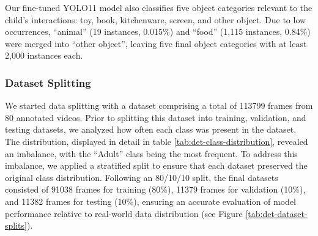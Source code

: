 \documentclass[
  man,floatsintext]{apa6}
\begin{document}
Our fine-tuned YOLO11 model also classifies five object categories relevant to the child's interactions: toy, book, kitchenware, screen, and other object. Due to low occurrences, ``animal'' (19 instances, 0.015\%) and ``food'' (1,115 instances, 0.84\%) were merged into ``other object'', leaving five final object categories with at least 2,000 instances each.

\subsubsection{Dataset Splitting}\label{dataset-splitting}

We started data splitting with a dataset comprising a total of 113799 frames from 80 annotated videos. Prior to splitting this dataset into training, validation, and testing datasets, we analyzed how often each class was present in the dataset. The distribution, displayed in detail in table \ref{tab:det-class-distribution}, revealed an imbalance, with the ``Adult'' class being the most frequent. To address this imbalance, we applied a stratified split to ensure that each dataset preserved the original class distribution. Following an 80/10/10 split, the final datasets consisted of 91038 frames for training (80\%), 11379 frames for validation (10\%), and 11382 frames for testing (10\%), ensuring an accurate evaluation of model performance relative to real-world data distribution (see Figure \ref{tab:det-dataset-splits}).
\end{document}
